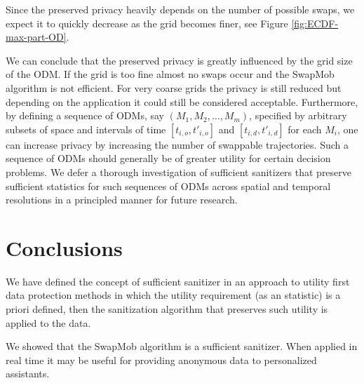 \documentclass[times,twocolumn,final,authoryear]{elsarticle}
\begin{document}
Since the preserved privacy heavily depends on the number of possible
swaps, we expect it to quickly decrease as the grid becomes finer, see Figure
\ref{fig:ECDF-max-part-OD}. 

We can conclude that the preserved privacy is greatly influenced by
the grid size of the ODM. If the grid is too fine almost no swaps occur
and the SwapMob algorithm is not efficient. For very coarse grids the
privacy is still reduced but depending on the application it could still
be considered acceptable.  
Furthermore, by defining a sequence of ODMs, say $(M_1,M_2,\ldots,M_m)$, specified by arbitrary subsets of space 
and intervals of time $[t_{i,o},t'_{i,o}]$ and $[t_{i,d},t'_{i,d}]$ for each $M_i$, one can increase privacy by increasing the number of swappable trajectories. Such a sequence of ODMs should generally be of greater utility for certain decision problems. We defer a thorough investigation of sufficient sanitizers that preserve sufficient statistics for such sequences of ODMs across spatial and temporal resolutions in a principled manner for future research.  

\section{Conclusions}\label{Sec:conclusions}

%

We have defined the concept of sufficient sanitizer in an approach to utility first data protection methods in which the utility requirement (as an statistic) is a priori defined, then the sanitization algorithm that preserves such utility is applied to the data.

We showed that the SwapMob algorithm is a sufficient sanitizer. When applied in real time it may be useful for providing anonymous data to personalized assistants. 
\end{document}

